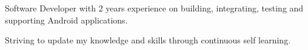 

\begin{cvparagraph}

Software Developer with 2 years experience on building, integrating, testing and supporting Android applications.
\end{cvparagraph}

\begin{cvparagraph}
Striving to update my knowledge and skills through continuous self learning.

\end{cvparagraph}
